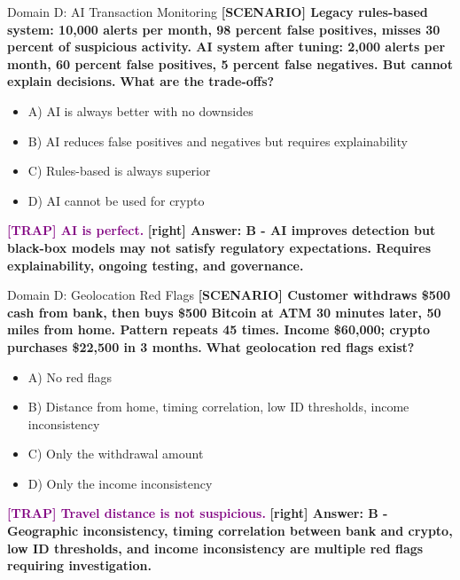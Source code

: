 \documentclass[11pt,a4paper]{beamer}
\newcommand{\trap}[1]{\textcolor{purple}{\textbf{[TRAP] #1}}}
\newcommand{\correct}[1]{\textcolor{green!50!black}{\textbf{[right] #1}}}
\newcommand{\scenario}[1]{\textcolor{blue!70!black}{\textbf{[SCENARIO] #1}}}
\begin{document}
\begin{frame}{Domain D: AI Transaction Monitoring}
\scenario{Legacy rules-based system: 10,000 alerts per month, 98 percent false positives, misses 30 percent of suspicious activity. AI system after tuning: 2,000 alerts per month, 60 percent false positives, 5 percent false negatives. But cannot explain decisions.}
\vspace{0.2cm}
\textbf{What are the trade-offs?}
\vspace{0.2cm}
\begin{itemize}
    \item A) AI is always better with no downsides
    \item B) AI reduces false positives and negatives but requires explainability
    \item C) Rules-based is always superior
    \item D) AI cannot be used for crypto
\end{itemize}
\vspace{0.2cm}
\trap{AI is perfect.}
\correct{Answer: B - AI improves detection but black-box models may not satisfy regulatory expectations. Requires explainability, ongoing testing, and governance.}
\end{frame}

\begin{frame}{Domain D: Geolocation Red Flags}
\scenario{Customer withdraws \$500 cash from bank, then buys \$500 Bitcoin at ATM 30 minutes later, 50 miles from home. Pattern repeats 45 times. Income \$60,000; crypto purchases \$22,500 in 3 months.}
\vspace{0.2cm}
\textbf{What geolocation red flags exist?}
\vspace{0.2cm}
\begin{itemize}
    \item A) No red flags
    \item B) Distance from home, timing correlation, low ID thresholds, income inconsistency
    \item C) Only the withdrawal amount
    \item D) Only the income inconsistency
\end{itemize}
\vspace{0.2cm}
\trap{Travel distance is not suspicious.}
\correct{Answer: B - Geographic inconsistency, timing correlation between bank and crypto, low ID thresholds, and income inconsistency are multiple red flags requiring investigation.}
\end{frame}
\end{document}
